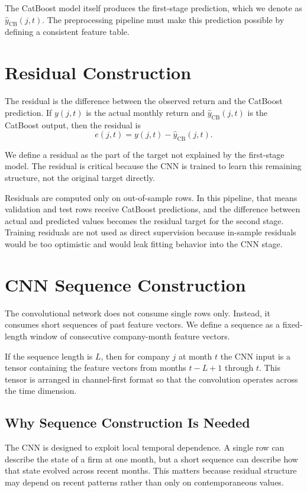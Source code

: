 \documentclass[11pt]{article}
\begin{document}
The CatBoost model itself produces the first-stage prediction, which we denote as $\hat{y}_{\mathrm{CB}}(j,t)$. The preprocessing pipeline must make this prediction possible by defining a consistent feature table.

\section{Residual Construction}

The residual is the difference between the observed return and the CatBoost prediction. If $y(j,t)$ is the actual monthly return and $\hat{y}_{\mathrm{CB}}(j,t)$ is the CatBoost output, then the residual is
\[
e(j,t) = y(j,t) - \hat{y}_{\mathrm{CB}}(j,t).
\]

We define a residual as the part of the target not explained by the first-stage model. The residual is critical because the CNN is trained to learn this remaining structure, not the original target directly.

Residuals are computed only on out-of-sample rows. In this pipeline, that means validation and test rows receive CatBoost predictions, and the difference between actual and predicted values becomes the residual target for the second stage. Training residuals are not used as direct supervision because in-sample residuals would be too optimistic and would leak fitting behavior into the CNN stage.

\section{CNN Sequence Construction}

The convolutional network does not consume single rows only. Instead, it consumes short sequences of past feature vectors. We define a sequence as a fixed-length window of consecutive company-month feature vectors.

If the sequence length is $L$, then for company $j$ at month $t$ the CNN input is a tensor containing the feature vectors from months $t-L+1$ through $t$. This tensor is arranged in channel-first format so that the convolution operates across the time dimension.

\subsection{Why Sequence Construction Is Needed}

The CNN is designed to exploit local temporal dependence. A single row can describe the state of a firm at one month, but a short sequence can describe how that state evolved across recent months. This matters because residual structure may depend on recent patterns rather than only on contemporaneous values.
\end{document}
